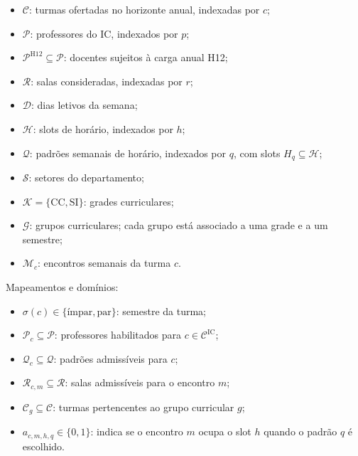 \begin{itemize}
    \item $\mathcal{C}$: turmas ofertadas no horizonte anual, indexadas por $c$;
    \item $\mathcal{P}$: professores do IC, indexados por $p$;
    \item $\mathcal{P}^{\mathrm{H12}}\subseteq\mathcal{P}$: docentes sujeitos à carga anual H12; 
    \item $\mathcal{R}$: salas consideradas, indexadas por $r$;
    \item $\mathcal{D}$: dias letivos da semana;
    \item $\mathcal{H}$: slots de horário, indexados por $h$;
    \item $\mathcal{Q}$: padrões semanais de horário, indexados por $q$, com slots $H_q\subseteq\mathcal{H}$;
    \item $\mathcal{S}$: setores do departamento;
    \item $\mathcal{K}=\{\mathrm{CC},\mathrm{SI}\}$: grades curriculares;
    \item $\mathcal{G}$: grupos curriculares; cada grupo está associado a uma grade e a um semestre;
    \item $\mathcal{M}_c$: encontros semanais da turma $c$.
\end{itemize}

Mapeamentos e domínios:
\begin{itemize}
    \item $\sigma(c)\in\{\text{ímpar},\text{par}\}$: semestre da turma;
    \item $\mathcal{P}_c\subseteq\mathcal{P}$: professores habilitados para $c\in\mathcal{C}^{\mathrm{IC}}$;
    \item $\mathcal{Q}_c\subseteq\mathcal{Q}$: padrões admissíveis para $c$;
    \item $\mathcal{R}_{c,m}\subseteq\mathcal{R}$: salas admissíveis para o encontro $m$;
    \item $\mathcal{C}_g\subseteq\mathcal{C}$: turmas pertencentes ao grupo curricular $g$;
    \item $a_{c,m,h,q}\in\{0,1\}$: indica se o encontro $m$ ocupa o slot $h$ quando o padrão $q$ é escolhido.
\end{itemize}

